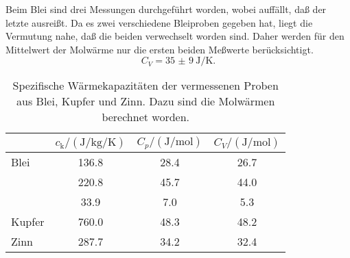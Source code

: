 Beim Blei sind drei Messungen durchgeführt worden, wobei auffällt, daß
der letzte ausreißt.  Da es zwei verschiedene Bleiproben gegeben hat,
liegt die Vermutung nahe, daß die beiden verwechselt worden sind.  Daher
werden für den Mittelwert der Molwärme nur die ersten beiden Meßwerte
berücksichtigt.
\begin{equation}
  C_V = \SI{35(9)}{\J\per\K}.
\end{equation}

\begin{table}
  \centering
  \begin{tabular}{lSSS}
    \toprule
    & {$c_\text{k}/(\si{\J\per\kg\per\K})$}
    & {$C_p/(\si{\J\per\mol})$}
    & {$C_V/(\si{\J\per\mol})$} \\
    \midrule
    Blei & 136.8 &  28.4 & 26.7  \\
    & 220.8 &  45.7 & 44.0  \\
    &  33.9  &   7.0 &  5.3  \\
    \midrule
    Kupfer & 760.0 & 48.3  &   48.2  \\
    \midrule
    Zinn & 287.7 &   34.2 &   32.4  \\
    \bottomrule
  \end{tabular}
  \caption{Spezifische Wärmekapazitäten der vermessenen Proben aus Blei,
    Kupfer und Zinn.  Dazu sind die Molwärmen berechnet worden.}
  \label{tab:molwaermen}
\end{table}


